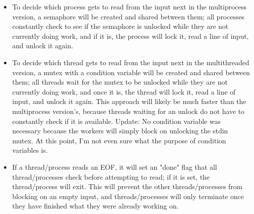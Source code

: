 \documentclass[letterpaper,10pt,fleqn]{article}
\numberwithin{equation}{section}
\begin{document}
\begin{itemize}
    \item To decide which process gets to read from the input next in the multiprocess version, a semaphore will be created and shared between them; all processes constantly check to see if the semaphore is unlocked while they are not currently doing work, and if it is, the process will lock it, read a line of input, and unlock it again.
    \item To decide which thread gets to read from the input next in the multithreaded version, a mutex with a condition variable will be created and shared between them; all threads wait for the mutex to be unlocked while they are not currently doing work, and once it is, the thread will lock it, read a line of input, and unlock it again.  This approach will likely be much faster than the multiprocess version's, because threads waiting for an unlock do not have to constantly check if it is available.  Update: No condition variable was necessary because the workers will simply block on unlocking the stdin mutex.  At this point, I'm not even sure what the purpose of condition variables is.
    \item If a thread/process reads an EOF, it will set an "done" flag that all thread/processes check before attempting to read; if it is set, the thread/process will exit.  This will prevent the other threads/processes from blocking on an empty input, and threads/processes will only terminate once they have finished what they were already working on.
\end{itemize}
\end{document}
